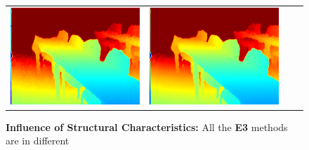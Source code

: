 \begin{figure}[h]
\begin{tabular}{@{}c@{ }c@{ }c@{ }c@{}}
\includegraphics[width=.3\linewidth]{Figures/results/s2_NoHoles/2Truth.png}&
\includegraphics[width=.3\linewidth]{Figures/results/s2_NoHoles/2Predicted.png}\\[-1ex]
\end{tabular}
\caption{\textbf{Influence of Structural Characteristics:} All the \textbf{E3} methods are in different  }%
\label{fig:results_SFA}
\end{figure}

